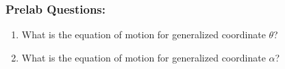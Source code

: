 \documentclass[12pt]{report}
\newcommand\drew[1]{\textcolor{red}{#1}}
\newcommand{\pder}[2]{\frac{\partial #1}{\partial #2}}
\begin{document}
\subsubsection{Prelab Questions:}\label{subsubsection:lab2s_prelab}
\begin{enumerate}
    \item What is the equation of motion for generalized coordinate $\theta$?\\
    \item What is the equation of motion for generalized coordinate $\alpha$?\\

\end{enumerate}
\end{document}
